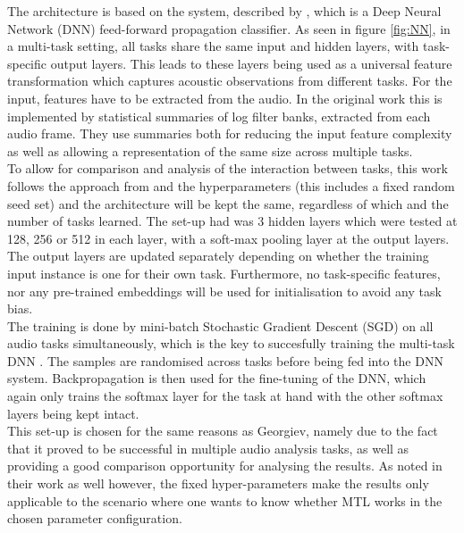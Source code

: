 	The architecture is based on the system, described by \citet{georgiev2017heterogeneous}, which is a Deep Neural Network (DNN) feed-forward propagation classifier. As seen in figure \ref{fig:NN}, in a multi-task setting, all tasks share the same input and hidden layers, with task-specific output layers. This leads to these layers being used as a universal feature transformation which captures acoustic observations from different tasks. For the input, features have to be extracted from the audio. In the original work this is implemented by statistical summaries of log filter banks, extracted from each audio frame. They use summaries both for reducing the input feature complexity as well as allowing a representation of the same size across multiple tasks. \\
	
	To allow for comparison and analysis of the interaction between tasks, this work follows the approach from \cite{alonso2016multitask} and \cite{bingel2017identifying} the hyperparameters (this includes a fixed random seed set) and the architecture will be kept the same, regardless of which and the number of tasks learned. The set-up \citet{georgiev2017heterogeneous} had was 3 hidden layers which were tested at 128, 256 or 512 in each layer, with a soft-max pooling layer at the output layers. The output layers are updated separately depending on whether the training input instance is one for their own task. Furthermore, no task-specific features, nor any pre-trained embeddings will be used for initialisation to avoid any task bias. \\
	
	The training is done by mini-batch Stochastic Gradient Descent (SGD) on all audio tasks simultaneously, which is the key to succesfully training the multi-task DNN \citep{georgiev2017heterogeneous}. The samples are randomised across tasks before being fed into the DNN system. Backpropagation is then used for the fine-tuning of the DNN, which again only trains the softmax layer for the task at hand with the other softmax layers being kept intact. \\
	
	This set-up is chosen for the same reasons as Georgiev, namely due to the fact that it proved to be successful in multiple audio analysis tasks, as well as providing a good comparison opportunity for analysing the results. As \citet{bingel2017identifying} noted in their work as well however, the fixed hyper-parameters make the results only applicable to the scenario where one wants to know whether MTL works in the chosen parameter configuration.\\
	
